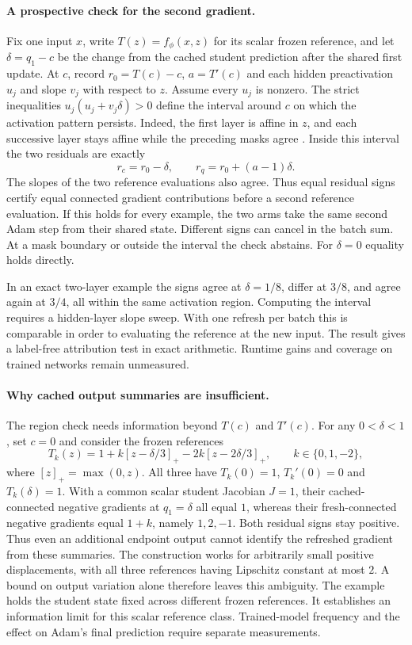 \documentclass[11pt,a4paper]{article}
\begin{document}
\paragraph{A prospective check for the second gradient.}
Fix one input $x$, write $T(z)=f_\phi(x,z)$ for its scalar frozen
reference, and let $\delta=q_1-c$ be the change from the cached student
prediction after the shared first update. At $c$, record $r_0=T(c)-c$,
$a=T'(c)$ and each hidden preactivation $u_j$ and slope $v_j$ with
respect to $z$. Assume every $u_j$ is nonzero. The strict inequalities
$u_j(u_j+v_j\delta)>0$ define the interval around $c$ on which the
activation pattern persists. Indeed, the first layer is affine in $z$,
and each successive layer stays affine while the preceding masks agree
\cite{croce}. Inside this interval the two residuals are exactly
\[
 r_c=r_0-\delta,\qquad r_q=r_0+(a-1)\delta .
\]
The slopes of the two reference evaluations also agree. Thus equal
residual signs certify equal connected gradient contributions before a
second reference evaluation. If this holds for every example, the two
arms take the same second Adam step from their shared state. Different
signs can cancel in the batch sum. At a mask boundary or outside the
interval the check abstains. For $\delta=0$ equality holds directly.

In an exact two-layer example the signs agree at $\delta=1/8$, differ
at $3/8$, and agree again at $3/4$, all within the same activation
region. Computing the interval requires a hidden-layer slope sweep.
With one refresh per batch this is comparable in order to evaluating the
reference at the new input. The result gives a label-free attribution
test in exact arithmetic. Runtime gains and coverage on trained networks
remain unmeasured.

\paragraph{Why cached output summaries are insufficient.}
The region check needs information beyond $T(c)$ and $T'(c)$.
For any $0<\delta<1$, set $c=0$ and consider the frozen references
\[
 T_k(z)=1+k[z-\delta/3]_+-2k[z-2\delta/3]_+,
 \qquad k\in\{0,1,-2\},
\]
where $[z]_+=\max(0,z)$. All three have $T_k(0)=1$,
$T_k'(0)=0$ and $T_k(\delta)=1$. With a common scalar student
Jacobian $J=1$, their cached-connected negative gradients at
$q_1=\delta$ all equal $1$, whereas their fresh-connected negative
gradients equal $1+k$, namely $1,2,-1$. Both residual signs stay positive.
Thus even an additional endpoint output cannot identify the refreshed
gradient from these summaries. The construction works for arbitrarily
small positive displacements, with all three references having
Lipschitz constant at most $2$. A bound on output variation alone
therefore leaves this ambiguity. The example holds the student state
fixed across different frozen references. It establishes an information
limit for this scalar reference class. Trained-model frequency and the
effect on Adam's final prediction require separate measurements.
\end{document}
